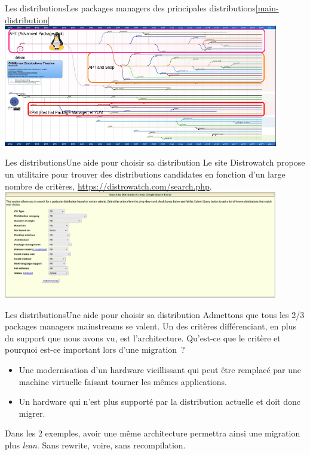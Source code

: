 \documentclass{beamer}
\begin{document}
    \begin{frame}{Les distributions}{Les packages managers des principales distributions\cref{main-distribution}}
        \centering
        \includegraphics[width=12cm]{image/main-distro-package-manager.drawio}
    \end{frame}

    \begin{frame}{Les distributions}{Une aide pour choisir sa distribution}
        Le site Distrowatch propose un utilitaire pour trouver des distributions candidates en fonction d'un large nombre de critères, \url{https://distrowatch.com/search.php}.
        \bigbreak
        \centering
        \includegraphics[width=12cm]{image/distrowatch-search}
    \end{frame}

    \begin{frame}{Les distributions}{Une aide pour choisir sa distribution}
        Admettons que tous les 2/3 packages managers mainstreams se valent.
        \bigbreak
        Un des critères différenciant, en plus du support que nous avons vu, est l'architecture.
        \bigbreak
        Qu'est-ce que le critère  et pourquoi est-ce important lors d'une migration~?
        \pause
        \bigbreak
        \begin{itemize}
            \item Une modernisation d'un hardware vieillissant qui peut être remplacé par une machine virtuelle faisant tourner les mêmes applications.
            \item Un hardware qui n'est plus supporté par la distribution actuelle et doit donc migrer.
        \end{itemize}
        Dans les 2 exemples, avoir une même architecture permettra ainsi une migration plus \textit{lean}.
        Sans rewrite, voire, sans recompilation.
    \end{frame}
\end{document}
